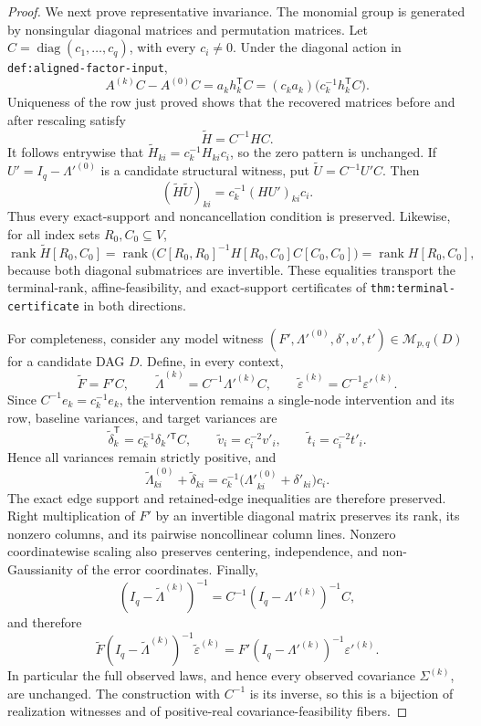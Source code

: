 \documentclass{article}
\begin{document}
\begin{proof}
We next prove representative invariance.  The monomial group is generated by
nonsingular diagonal matrices and permutation matrices.  Let
\(C=\operatorname{diag}(c_1,\ldots,c_q)\), with every \(c_i\ne0\).  Under the
diagonal action in \texttt{def:aligned-factor-input},
\[
 A^{(k)}C-A^{(0)}C
 =a_kh_k^{\mathsf T}C
 =(c_ka_k)\bigl(c_k^{-1}h_k^{\mathsf T}C\bigr).
\]
Uniqueness of the row just proved shows that the recovered matrices before and
after rescaling satisfy
\[
 \widetilde H=C^{-1}HC.
\]
It follows entrywise that \(\widetilde H_{ki}=c_k^{-1}H_{ki}c_i\), so the zero
pattern is unchanged.  If \(U'=I_q-\Lambda'^{(0)}\) is a candidate structural
witness, put \(\widetilde U=C^{-1}U'C\).  Then
\[
 (\widetilde H\widetilde U)_{ki}
 =c_k^{-1}(HU')_{ki}c_i.
\]
Thus every exact-support and noncancellation condition is preserved.  Likewise,
for all index sets \(R_0,C_0\subseteq V\),
\[
 \operatorname{rank}\widetilde H[R_0,C_0]
 =\operatorname{rank}\bigl(C[R_0,R_0]^{-1}H[R_0,C_0]C[C_0,C_0]\bigr)
 =\operatorname{rank}H[R_0,C_0],
\]
because both diagonal submatrices are invertible.  These equalities transport the
terminal-rank, affine-feasibility, and exact-support certificates of
\texttt{thm:terminal-certificate} in both directions.

For completeness, consider any model witness
\((F',\Lambda'^{(0)},\delta',v',t')\in\mathcal M_{p,q}(D)\) for a candidate DAG
\(D\).  Define, in every context,
\[
 \widetilde F=F'C,
 \qquad
 \widetilde\Lambda^{(k)}=C^{-1}\Lambda'^{(k)}C,
 \qquad
 \widetilde\varepsilon^{(k)}=C^{-1}\varepsilon'^{(k)}.
\]
Since \(C^{-1}e_k=c_k^{-1}e_k\), the intervention remains a single-node
intervention and its row, baseline variances, and target variances are
\[
 \widetilde\delta_k^{\mathsf T}=c_k^{-1}\delta_k'{}^{\mathsf T}C,
 \qquad
 \widetilde v_i=c_i^{-2}v'_i,
 \qquad
 \widetilde t_i=c_i^{-2}t'_i.
\]
Hence all variances remain strictly positive, and
\[
 \widetilde\Lambda^{(0)}_{ki}+\widetilde\delta_{ki}
 =c_k^{-1}\bigl(\Lambda'^{(0)}_{ki}+\delta'_{ki}\bigr)c_i.
\]
The exact edge support and retained-edge inequalities are therefore preserved.
Right multiplication of \(F'\) by an invertible diagonal matrix preserves its
rank, its nonzero columns, and its pairwise noncollinear column lines.  Nonzero
coordinatewise scaling also preserves centering, independence, and
non-Gaussianity of the error coordinates.  Finally,
\[
 (I_q-\widetilde\Lambda^{(k)})^{-1}
 =C^{-1}(I_q-\Lambda'^{(k)})^{-1}C,
\]
and therefore
\[
 \widetilde F(I_q-\widetilde\Lambda^{(k)})^{-1}
 \widetilde\varepsilon^{(k)}
 =F'(I_q-\Lambda'^{(k)})^{-1}\varepsilon'^{(k)}.
\]
In particular the full observed laws, and hence every observed covariance
\(\Sigma^{(k)}\), are unchanged.  The construction with \(C^{-1}\) is its
inverse, so this is a bijection of realization witnesses and of positive-real
covariance-feasibility fibers.


\end{proof}
\end{document}
